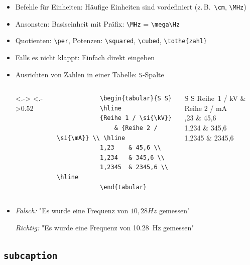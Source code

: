 \begin{frame}[<+->][fragile]
	\begin{itemize}
		\item Befehle für Einheiten: Häufige Einheiten sind vordefiniert (z.\,B.\ \lstinline!\cm!, \lstinline!\MHz!)
		\item Ansonsten: Basiseinheit mit Präfix: \lstinline!\MHz! = \lstinline!\mega\Hz!
		\item Quotienten: \lstinline!\per!, Potenzen: \lstinline!\squared!, \lstinline!\cubed!, \lstinline!\tothe{zahl}!
		\item Falls es nicht klappt: Einfach direkt eingeben
		\item Ausrichten von Zahlen in einer Tabelle: \lstinline!S!-Spalte
		\begin{columns}<.->
			\lstset{basicstyle=\footnotesize\ttfamily}
			\hspace{0.5cm}
			\column<.->{0.52\textwidth}
			\begin{lstlisting}
			\begin{tabular}{S S}
			\hline
			{Reihe 1 / \si{\kV}}
			    & {Reihe 2 / \si{\mA}} \\ \hline
			1,23	& 45,6 \\
			1,234	& 345,6 \\
			1,2345	& 2345,6 \\ \hline
			\end{tabular}
			\end{lstlisting}
			\rmfamily
			\begin{tabular}{S S}
				\hline
				{Reihe~1 / \si{\kV}}
				    & {Reihe 2 / \si{\mA}} \\ ,23	& 45,6 \\
				1,234	& 345,6 \\
				1,2345	& 2345,6 \\ \hline
			\end{tabular}
		\end{columns}
		\item \emph{Falsch:} "{\rmfamily Es wurde eine Frequenz von $10,28 Hz$ gemessen}"
		
		\emph{Richtig:} "{\rmfamily Es wurde eine Frequenz von \SI[detect-family=true]{10,28}{Hz} gemessen}"
	\end{itemize}
\end{frame}

\subsection{\texttt{subcaption}}

